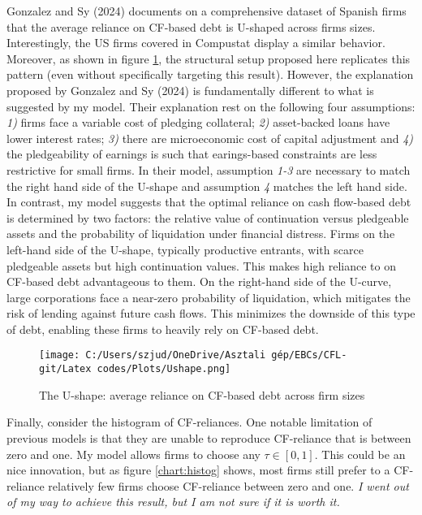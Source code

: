 \documentclass[12pt]{article}
\begin{document}
\noindent Gonzalez and Sy (2024) documents on a comprehensive dataset of Spanish firms that the average reliance on CF-based debt is U-shaped across firms sizes. Interestingly, the US firms covered in Compustat display a similar behavior.  Moreover, as shown in figure \ref{chart:Ushape}, the structural setup proposed here replicates this pattern (even without specifically targeting this result). However, the explanation proposed by Gonzalez and Sy (2024) is fundamentally different to what is suggested by my model. Their explanation rest on the following four assumptions: \textit{1)} firms face a variable cost of pledging collateral; \textit{2)} asset-backed loans have lower interest rates; \textit{3)} there are microeconomic cost of capital adjustment and \textit{4)} the pledgeability of earnings is such that earings-based constraints are less restrictive for small firms. In their model, assumption \textit{1-3} are necessary to match the right hand side of the U-shape and assumption \textit{4} matches the left hand side. \vspace{3mm} \\
In contrast, my model suggests that the optimal reliance on cash flow-based debt is determined by two factors: the relative value of continuation versus pledgeable assets and the probability of liquidation under financial distress. Firms on the left-hand side of the U-shape, typically productive entrants, with scarce pledgeable assets but high continuation values. This makes high reliance to on CF-based debt advantageous to them. On the right-hand side of the U-curve, large corporations face a near-zero probability of liquidation, which mitigates the risk of lending against future cash flows. This minimizes the downside of this type of debt, enabling these firms to heavily rely on CF-based debt.

\begin{figure}[H]  %
    \centering
    \texttt{[image: C:/Users/szjud/OneDrive/Asztali gép/EBCs/CFL-git/Latex codes/Plots/Ushape.png]}
    \caption{The U-shape: average reliance on CF-based debt across firm sizes} \label{chart:Ushape}
\end{figure}

\noindent Finally, consider the histogram of CF-reliances. One notable limitation of previous models is that they are unable to reproduce CF-reliance that is between zero and one. My model allows firms to choose any $\tau \in [0,1]$. This could be an nice innovation, but as figure \ref{chart:histog} shows, most firms still prefer to a CF-reliance relatively few firms choose CF-reliance between zero and one. \textit{I went out of my way to achieve this result, but I am not sure if it is worth it.}
\end{document}
